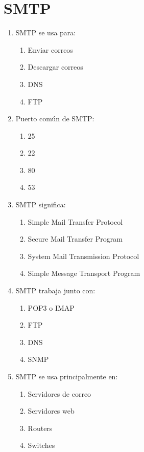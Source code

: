 \documentclass[12pt]{article}
\begin{document}
\section*{SMTP}

\begin{enumerate}[label=\textbf{SMTP-\arabic*.}]

\item SMTP se usa para:
\begin{enumerate}[label=\alph*)]
\item Enviar correos
\item Descargar correos
\item DNS
\item FTP
\end{enumerate}

\item Puerto común de SMTP:
\begin{enumerate}[label=\alph*)]
\item 25
\item 22
\item 80
\item 53
\end{enumerate}

\item SMTP significa:
\begin{enumerate}[label=\alph*)]
\item Simple Mail Transfer Protocol
\item Secure Mail Transfer Program
\item System Mail Transmission Protocol
\item Simple Message Transport Program
\end{enumerate}

\item SMTP trabaja junto con:
\begin{enumerate}[label=\alph*)]
\item POP3 o IMAP
\item FTP
\item DNS
\item SNMP
\end{enumerate}

\item SMTP se usa principalmente en:
\begin{enumerate}[label=\alph*)]
\item Servidores de correo
\item Servidores web
\item Routers
\item Switches
\end{enumerate}

\end{enumerate}
\end{document}
